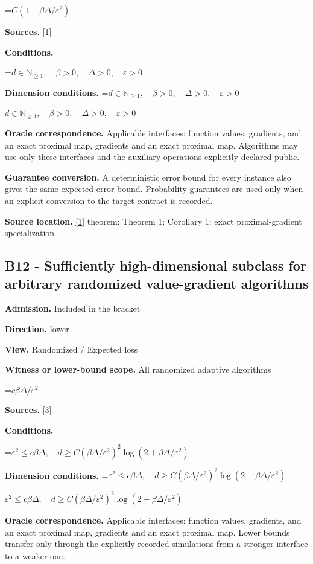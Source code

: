 \documentclass[10pt,a4paper]{article}
\newcommand{\AtlasMath}[1]{\par\begingroup\centering\setbox0=\hbox{$\displaystyle #1$}\ifdim\wd0>1.4\linewidth\typeout{ATLAS WIDE FORMULA: \the\wd0}\fi\ifdim\wd0>\linewidth\resizebox{\linewidth}{!}{\box0}\else\box0\fi\par\endgroup}
\newcommand{\AtlasInlineMath}[1]{\begingroup\setbox0=\hbox{$#1$}\ifdim\wd0>.4\linewidth\endgroup\AtlasMath{#1}\else\endgroup$#1$\fi}
\begin{document}
\AtlasMath{C(1+\beta\Delta/\varepsilon^2)}
\textbf{Sources.} \href{https://arxiv.org/pdf/1308.6594}{[1]}

\textbf{Conditions.} 
\AtlasMath{d\in\mathbb{N}_{\ge1},\quad \beta>0,\quad \Delta>0,\quad \varepsilon>0}


\textbf{Dimension conditions.} \AtlasInlineMath{d\in\mathbb{N}_{\ge1},\quad \beta>0,\quad \Delta>0,\quad \varepsilon>0}

\textbf{Oracle correspondence.} Applicable interfaces: function values, gradients, and an exact proximal map, gradients and an exact proximal map. Algorithms may use only these interfaces and the auxiliary operations explicitly declared public.

\textbf{Guarantee conversion.} A deterministic error bound for every instance also gives the same expected-error bound. Probability guarantees are used only when an explicit conversion to the target contract is recorded.

\textbf{Source location.} \href{https://arxiv.org/pdf/1308.6594}{[1]} theorem: Theorem 1; Corollary 1: exact proximal-gradient specialization

\subsection{B12 - Sufficiently high-dimensional subclass for arbitrary randomized value-gradient algorithms}
\textbf{Admission.} Included in the bracket

\textbf{Direction.} lower

\textbf{View.} Randomized / Expected loss

\textbf{Witness or lower-bound scope.} All randomized adaptive algorithms

\AtlasMath{c\beta\Delta/\varepsilon^2}
\textbf{Sources.} \href{https://arxiv.org/pdf/1710.11606}{[3]}

\textbf{Conditions.} 
\AtlasMath{\varepsilon^2\le c\beta\Delta,\quad d\ge C(\beta\Delta/\varepsilon^2)^2\log(2+\beta\Delta/\varepsilon^2)}


\textbf{Dimension conditions.} \AtlasInlineMath{\varepsilon^2\le c\beta\Delta,\quad d\ge C(\beta\Delta/\varepsilon^2)^2\log(2+\beta\Delta/\varepsilon^2)}

\textbf{Oracle correspondence.} Applicable interfaces: function values, gradients, and an exact proximal map, gradients and an exact proximal map. Lower bounds transfer only through the explicitly recorded simulations from a stronger interface to a weaker one.
\end{document}
